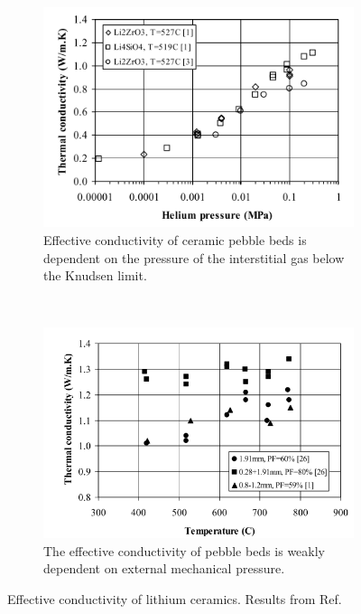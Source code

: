 \documentclass[11pt]{report} %
\begin{document}
\begin{figure}[h]
        \centering
        \begin{subfigure}[t]{0.45\textwidth}
                \includegraphics[width=\textwidth]{images/keff-pressure}
                \caption{Effective conductivity of ceramic pebble beds is dependent on the pressure of the interstitial gas below the Knudsen limit.}
                \label{fig:keff-pressure}
        \end{subfigure}%
        ~
        \begin{subfigure}[t]{0.45\textwidth}
                \includegraphics[width=\textwidth]{images/lit-keff-exp}
                \caption{The effective conductivity of pebble beds is weakly dependent on external mechanical pressure.}
                \label{fig:keff-lit}
        \end{subfigure}
        \caption{Effective conductivity of lithium ceramics. Results from Ref.~\cite{Abou-Sena2005}}\label{fig:keff}
\end{figure}
\end{document}
